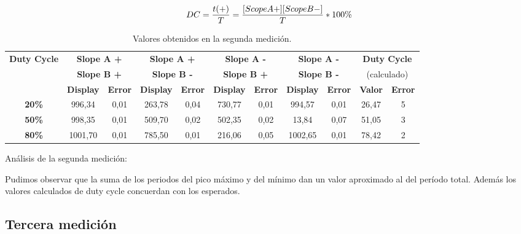 \documentclass{article}
\begin{document}
		\begin{equation*}
			DC = {t(+) \over T} = {[Scope A+][Scope B-] \over T }* 100 \%
		\end{equation*}	 
\bigskip


\begin{table}[!hbt]
	\begin{center}

		\begin{tabular}{|c|c|c|c|c|c|c|c|c|c|c|} \hline
			\multirow{3}{*}{\textbf{Duty Cycle}}
			& \multicolumn{2}{c|}{\textbf{Slope A +}} & \multicolumn{2}{c|}{\textbf{Slope A +}} & \multicolumn{2}{c|}{\textbf{Slope A -}} & \multicolumn{2}{c|}{\textbf{Slope A -}} & \multicolumn{2}{c|}{\textbf{Duty Cycle}} \\
			& \multicolumn{2}{c|}{\textbf{Slope B +}} & \multicolumn{2}{c|}{\textbf{Slope B -}} & \multicolumn{2}{c|}{\textbf{Slope B +}} & \multicolumn{2}{c|}{\textbf{Slope B -}} & \multicolumn{2}{c|}{(calculado)} \\\cline{2-11}
			& \textbf{Display} & \textbf{Error} & \textbf{Display} & \textbf{Error} & \textbf{Display} & \textbf{Error} & \textbf{Display} & \textbf{Error} & \textbf{Valor} & \textbf{Error} \\\hline
			
			\textbf{20\%} & 996,34 & 0,01  & 263,78 & 0,04 & 730,77 & 0,01 & 994,57 & 0,01 & 26,47 & 5 \\\hline
			\textbf{50\%} & 998,35 & 0,01 & 509,70 & 0,02 & 502,35 & 0,02 & 13,84 & 0,07 & 51,05 & 3 \\\hline
			\textbf{80\%} & 1001,70 & 0,01 & 785,50 & 0,01 & 216,06 & 0,05 & 1002,65 & 0,01 & 78,42 & 2 \\\hline
		\end{tabular}

	\caption{Valores obtenidos en la segunda medición.}
	\end{center}
\end{table}
\medskip
Análisis de la segunda medición:	

		Pudimos observar que la suma de los periodos del pico máximo y del mínimo dan un valor aproximado al del período total. Además los valores calculados de duty cycle concuerdan con los esperados.


\subsection{Tercera medición}
\end{document}
